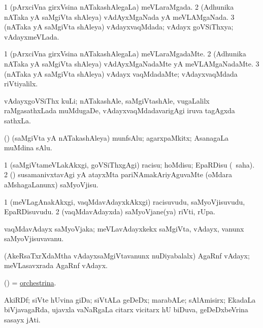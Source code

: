 \bentry
{}
\gl{\gu}
\bmng
\bnum
\num{1} (pArxciVna girxVsina nATakashAlegaLa) meVLaraMgada. 
\num{2} (Adhunika nATaka yA saMgiVta shAleya) vAdAyxMgaNada yA meVLAMgaNada. 
\num{3} (nATaka yA saMgiVta shAleya) vAdayxvaqMdada; vAdayx goVSiThxya; vAdayxmeVLada. 
\enum
\emng
\eentry

\bentry
{}
\gl{\kirxvi}
\bmng
\bnum
\num{1} (pArxciVna girxVsina nATakashAlegaLa) meVLaraMgadaMte. 
\num{2} (Adhunika nATaka yA saMgiVta shAleya) vAdAyxMgaNadaMte yA meVLAMgaNadaMte. 
\num{3} (nATaka yA saMgiVta shAleya) vAdayx vaqMdadaMte; vAdayxvaqMdada riVtiyalilx. 
\enum
\emng
\eentry

\bentry
{}
\gl{\nA}
\bmng
vAdayxgoVSiThx kuLi; nATakashAle, saMgiVtashAle, \mo vugaLalilx raMgasathxLada muMdugaDe, vAdayxvaqMdadavarigAgi iruva tagAgxda sathxLa. 
\emng
\eentry

\bentry
{}
\gl{\nA}
\bmng
(\bava) (saMgiVta yA nATakashAleya) munfsAlu; agarxpaMkitx; AsanagaLa muMdina sAlu. 
\emng
\eentry

\bentry
{}
\gl{\sakirx}
\bmng
\bnum
\num{1} (saMgiVtameVLakAkxgi, goVSiThxgAgi) racisu; hoMdisu; EpaRDisu (\akirx\ saha). 
\num{2} (\rUpa) susamanivxtavAgi yA atayxMta pariNAmakAriyAguvaMte (oMdara aMshagaLanunx) saMyoVjisu. 
\enum
\emng
\eentry

\bentry
{}
\gl{\nA}
\bmng
\bnum
\num{1} (meVLagAnakAkxgi, vaqMdavAdayxkAkxgi) racisuvudu, saMyoVjisuvudu, EpaRDisuvudu. 
\num{2} (vaqMdavAdayxda) saMyoVjane(ya) riVti, rUpa. 
\enum
\emng
\eentry

\bentry
{}
\gl{\nA}
\bmng
vaqMdavAdayx saMyoVjaka; meVLavAdayxkekx saMgiVta, vAdayx, \mo vanunx saMyoVjisuvavanu. 
\emng
\eentry

\bentry
{}
\gl{\nA}
\bmng
(AkeRsaTxrXdaMtha vAdayxsaMgiVtavanunx nuDiyabalalx) AgaRnf vAdayx; meVLasavxrada AgaRnf vAdayx. 
\emng
\eentry

\bentry
{}
\gl{\nA}
\bmng
(\ame) = \hyperlink{orchestrina}{orchestrina}. 
\emng
\eentry

\bentry
{}
\gl{\nA}
\bmng
AkiRDf; siVte hUvina giDa; siVtALa geDeDx; marabALe; sAlAmisirx; EkadaLa biVjavagaRda, ujavxla vaNaRgaLa citarx vicitarx hU biDuva, geDeDxbeVrina sasayx jAti.  
\emng
\eentry

